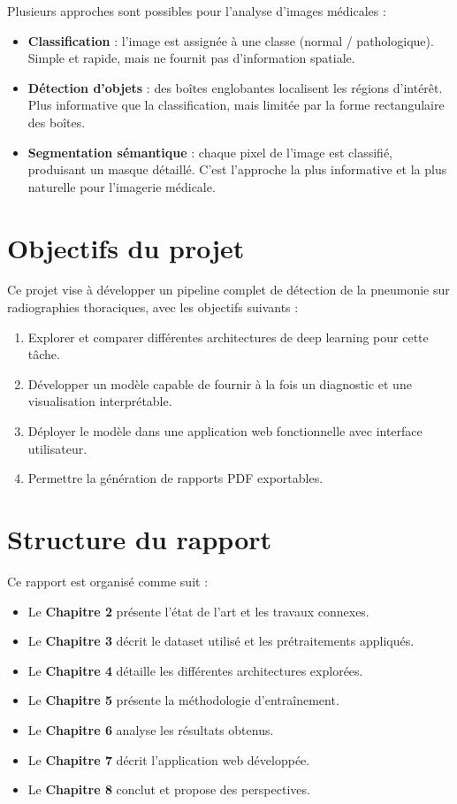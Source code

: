 \documentclass[12pt,a4paper,twoside]{report}
\begin{document}
Plusieurs approches sont possibles pour l'analyse d'images médicales :

\begin{itemize}
  \item \textbf{Classification} : l'image est assignée à une classe (normal / pathologique). Simple et rapide, mais ne fournit pas d'information spatiale.
  \item \textbf{Détection d'objets} : des boîtes englobantes localisent les régions d'intérêt. Plus informative que la classification, mais limitée par la forme rectangulaire des boîtes.
  \item \textbf{Segmentation sémantique} : chaque pixel de l'image est classifié, produisant un masque détaillé. C'est l'approche la plus informative et la plus naturelle pour l'imagerie médicale.
\end{itemize}

\section{Objectifs du projet}

Ce projet vise à développer un pipeline complet de détection de la pneumonie sur radiographies thoraciques, avec les objectifs suivants :

\begin{enumerate}
  \item Explorer et comparer différentes architectures de deep learning pour cette tâche.
  \item Développer un modèle capable de fournir à la fois un diagnostic et une visualisation interprétable.
  \item Déployer le modèle dans une application web fonctionnelle avec interface utilisateur.
  \item Permettre la génération de rapports PDF exportables.
\end{enumerate}

\section{Structure du rapport}

Ce rapport est organisé comme suit :
\begin{itemize}
  \item Le \textbf{Chapitre 2} présente l'état de l'art et les travaux connexes.
  \item Le \textbf{Chapitre 3} décrit le dataset utilisé et les prétraitements appliqués.
  \item Le \textbf{Chapitre 4} détaille les différentes architectures explorées.
  \item Le \textbf{Chapitre 5} présente la méthodologie d'entraînement.
  \item Le \textbf{Chapitre 6} analyse les résultats obtenus.
  \item Le \textbf{Chapitre 7} décrit l'application web développée.
  \item Le \textbf{Chapitre 8} conclut et propose des perspectives.
\end{itemize}
\end{document}
